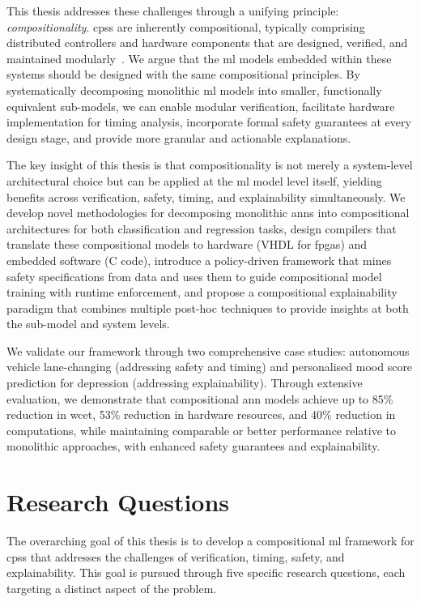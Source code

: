 This thesis addresses these challenges through a unifying principle: \emph{compositionality}. \glspl{cps} are inherently compositional, typically comprising distributed controllers and hardware components that are designed, verified, and maintained modularly~\cite{alur_principles_2015, tripakis_compositionality_2016}. We argue that the \gls{ml} models embedded within these systems should be designed with the same compositional principles. By systematically decomposing monolithic \gls{ml} models into smaller, functionally equivalent sub-models, we can enable modular verification, facilitate hardware implementation for timing analysis, incorporate formal safety guarantees at every design stage, and provide more granular and actionable explanations.

The key insight of this thesis is that compositionality is not merely a system-level architectural choice but can be applied at the \gls{ml} model level itself, yielding benefits across verification, safety, timing, and explainability simultaneously. We develop novel methodologies for decomposing monolithic \glspl{ann} into compositional architectures for both classification and regression tasks, design compilers that translate these compositional models to hardware (VHDL for \glspl{fpga}) and embedded software (C code), introduce a policy-driven framework that mines safety specifications from data and uses them to guide compositional model training with runtime enforcement, and propose a compositional explainability paradigm that combines multiple post-hoc techniques to provide insights at both the sub-model and system levels.

We validate our framework through two comprehensive case studies: autonomous vehicle lane-changing (addressing safety and timing) and personalised mood score prediction for depression (addressing explainability). Through extensive evaluation, we demonstrate that compositional \gls{ann} models achieve up to 85\% reduction in \gls{wcet}, 53\% reduction in hardware resources, and 40\% reduction in computations, while maintaining comparable or better performance relative to monolithic approaches, with enhanced safety guarantees and explainability.


\section{Research Questions}
\label{sec:research_questions}

The overarching goal of this thesis is to develop a compositional \gls{ml} framework for \glspl{cps} that addresses the challenges of verification, timing, safety, and explainability. This goal is pursued through five specific research questions, each targeting a distinct aspect of the problem.

